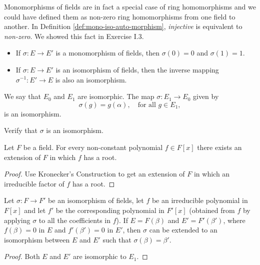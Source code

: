 \begin{note}
	Monomorphisms of fields are in fact a special case of ring homomorphisms and we could have defined them as non-zero ring homomorphisms from one field to another. In Definition \ref{def:mono-iso-auto-morphism}, \emph{injective} is equivalent to \emph{non-zero}. We showed this fact in Exercise I.3.
\end{note}

\begin{exercises}[Easy]\hfill
	\begin{itemize}
		\item If $\sigma : E \to E'$ is a monomorphism of fields, then $\sigma(0) = 0$ and $\sigma(1) = 1$.
		\item If $\sigma : E \to E'$ is an isomorphism of fields, then the inverse mapping $\sigma^{-1} : E' \to E$ is also an isomorphism.
	\end{itemize}
\end{exercises}

We say that $E_0$ and $E_1$ are isomorphic. The map $\sigma : E_1 \to E_0$ given by
\[
	\sigma(g) = g(\alpha), \quad \text{for all } g \in E_1,
\]
is an isomorphism.

\begin{exercise}[Useful]
	Verify that $\sigma$ is an isomorphism.
\end{exercise}

\begin{theorem}[L. Kronecker]
	Let $F$ be a field. For every non-constant polynomial $f \in F[x]$ there exists an extension of $F$ in which $f$ has a root.
	\begin{proof}
		Use Kronecker's Construction to get an extension of $F$ in which an irreducible factor of $f$ has a root.
	\end{proof}
\end{theorem}

\begin{theorem}\label{thm:8}
	Let $\sigma : F \to F'$ be an isomorphism of fields, let $f$ be an irreducible polynomial in $F[x]$ and let $f'$ be the corresponding polynomial in $F'[x]$ (obtained from $f$ by applying $\sigma$ to all the coefficients in $f$). If $E = F(\beta)$ and $E' = F'(\beta')$, where $f(\beta) = 0$ in $E$ and $f'(\beta') = 0$ in $E'$, then $\sigma$ can be extended to an isomorphism between $E$ and $E'$ such that $\sigma(\beta) = \beta'$.
	\begin{proof}
		Both $E$ and $E'$ are isomorphic to $E_1$.
	\end{proof}
\end{theorem}


